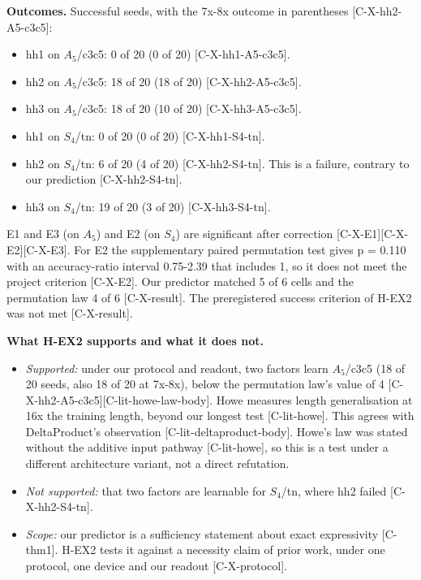 \documentclass[10pt,twocolumn,a4paper]{article}
\providecommand{\tightlist}{\setlength{\itemsep}{0pt}\setlength{\parskip}{0pt}}
\begin{document}
\textbf{Outcomes.} Successful seeds, with the 7x-8x outcome in parentheses {[}C-X-hh2-A5-c3c5{]}:

\begin{itemize}
\tightlist
\item
  hh1 on \(A_5\)/c3c5: 0 of 20 (0 of 20) {[}C-X-hh1-A5-c3c5{]}.
\item
  hh2 on \(A_5\)/c3c5: 18 of 20 (18 of 20) {[}C-X-hh2-A5-c3c5{]}.
\item
  hh3 on \(A_5\)/c3c5: 18 of 20 (10 of 20) {[}C-X-hh3-A5-c3c5{]}.
\item
  hh1 on \(S_4\)/tn: 0 of 20 (0 of 20) {[}C-X-hh1-S4-tn{]}.
\item
  hh2 on \(S_4\)/tn: 6 of 20 (4 of 20) {[}C-X-hh2-S4-tn{]}. This is a failure, contrary to our prediction {[}C-X-hh2-S4-tn{]}.
\item
  hh3 on \(S_4\)/tn: 19 of 20 (3 of 20) {[}C-X-hh3-S4-tn{]}.
\end{itemize}

E1 and E3 (on \(A_5\)) and E2 (on \(S_4\)) are significant after correction {[}C-X-E1{]}{[}C-X-E2{]}{[}C-X-E3{]}. For E2 the supplementary paired permutation test gives p = 0.110 with an accuracy-ratio interval 0.75-2.39 that includes 1, so it does not meet the project criterion {[}C-X-E2{]}. Our predictor matched 5 of 6 cells and the permutation law 4 of 6 {[}C-X-result{]}. The preregistered success criterion of H-EX2 was not met {[}C-X-result{]}.

\textbf{What H-EX2 supports and what it does not.}

\begin{itemize}
\tightlist
\item
  \emph{Supported:} under our protocol and readout, two factors learn \(A_5\)/c3c5 (18 of 20 seeds, also 18 of 20 at 7x-8x), below the permutation law's value of 4 {[}C-X-hh2-A5-c3c5{]}{[}C-lit-howe-law-body{]}. Howe measures length generalisation at 16x the training length, beyond our longest test {[}C-lit-howe{]}. This agrees with DeltaProduct's observation {[}C-lit-deltaproduct-body{]}. Howe's law was stated without the additive input pathway {[}C-lit-howe{]}, so this is a test under a different architecture variant, not a direct refutation.
\item
  \emph{Not supported:} that two factors are learnable for \(S_4\)/tn, where hh2 failed {[}C-X-hh2-S4-tn{]}.
\item
  \emph{Scope:} our predictor is a sufficiency statement about exact expressivity {[}C-thm1{]}. H-EX2 tests it against a necessity claim of prior work, under one protocol, one device and our readout {[}C-X-protocol{]}.
\end{itemize}
\end{document}
